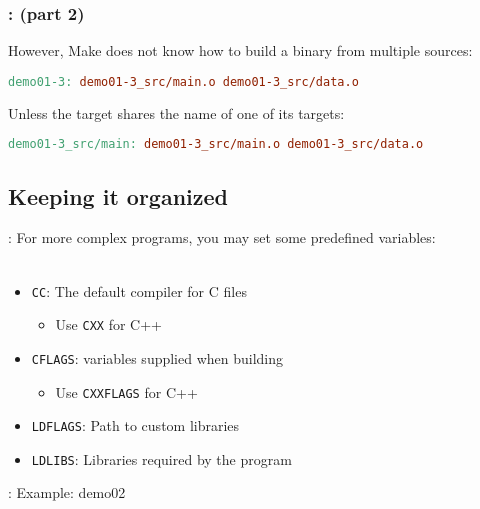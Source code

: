 \begin{frame}[fragile]
    \frametitle{\secname: \small\subsecname (part 2)\normalsize}

    However, Make does not know how to build a binary from multiple sources:

    \begin{lstlisting}[language=make]
demo01-3: demo01-3_src/main.o demo01-3_src/data.o
    \end{lstlisting}

    Unless the target shares the name of one of its targets:
    \begin{lstlisting}[language=make]
demo01-3_src/main: demo01-3_src/main.o demo01-3_src/data.o
    \end{lstlisting}
\end{frame}

%
%
%

\subsection{Keeping it organized}
\begin{frame}{\secname: \small\subsecname\normalsize}
    For more complex programs, you may set some predefined
    variables: \\~\\

    \begin{itemize}
        \item \texttt{CC}: The default compiler for C files
        \begin{itemize}
            \item Use \texttt{CXX} for C++
        \end{itemize}
        \item \texttt{CFLAGS}: variables supplied when building
        \begin{itemize}
            \item Use \texttt{CXXFLAGS} for C++
        \end{itemize}
        \item \texttt{LDFLAGS}: Path to custom libraries
        \item \texttt{LDLIBS}: Libraries required by the program
    \end{itemize}
\end{frame}

\begin{frame}{\secname: \small\subsecname\normalsize}
    Example: demo02
\end{frame}
